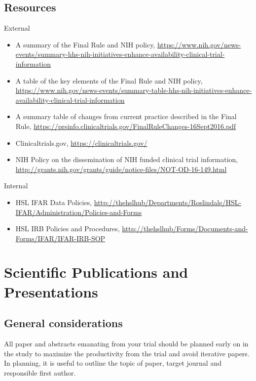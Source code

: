 \documentclass[]{book}
\providecommand{\tightlist}{%
  \setlength{\itemsep}{0pt}\setlength{\parskip}{0pt}}
\theoremstyle{definition}
\theoremstyle{definition}
\theoremstyle{definition}
\theoremstyle{remark}
\begin{document}
\subsection{Resources}\label{resources-18}

External

\begin{itemize}
\tightlist
\item
  A summary of the Final Rule and NIH policy,
  \url{https://www.nih.gov/news-events/summary-hhs-nih-initiatives-enhance-availability-clinical-trial-information}
\item
  A table of the key elements of the Final Rule and NIH policy,
  \url{https://www.nih.gov/news-events/summary-table-hhs-nih-initiatives-enhance-availability-clinical-trial-information}
\item
  A summary table of changes from current practice described in the
  Final Rule,
  \url{https://prsinfo.clinicaltrials.gov/FinalRuleChanges-16Sept2016.pdf}
\item
  Clinicaltrials.gov, \url{https://clinicaltrials.gov/}
\item
  NIH Policy on the dissemination of NIH funded clinical trial
  information,
  \url{http://grants.nih.gov/grants/guide/notice-files/NOT-OD-16-149.html}
\end{itemize}

Internal

\begin{itemize}
\tightlist
\item
  HSL IFAR Data Policies,
  \url{http://thehslhub/Departments/Roslindale/HSL-IFAR/Administration/Policies-and-Forms}
\item
  HSL IRB Policies and Procedures,
  \url{http://thehslhub/Forms/Documents-and-Forms/IFAR/IFAR-IRB-SOP}
\end{itemize}

\section{Scientific Publications and
Presentations}\label{scientific-publications-and-presentations}

\subsection{General considerations}\label{general-considerations-1}

All paper and abstracts emanating from your trial should be planned
early on in the study to maximize the productivity from the trial and
avoid iterative papers. In planning, it is useful to outline the topic
of paper, target journal and responsible first author.
\end{document}
